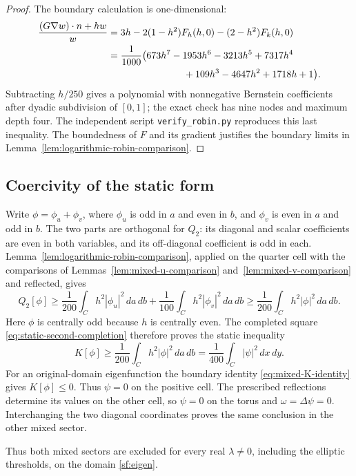 \documentclass[reqno,11pt]{amsart}
\numberwithin{equation}{section}
\theoremstyle{remark}
\begin{document}
\begin{proof}
The boundary calculation is one-dimensional:
\begin{align*}
 \frac{(G\nabla w)\cdot n+hw}{w}
 ={}&3h-2(1-h^2)F_h(h,0)-(2-h^2)F_k(h,0)\\
 ={}&\frac1{1000}\bigl(673h^7-1953h^6-3213h^5+7317h^4\\
    &\hspace{23mm}+109h^3-4647h^2+1718h+1\bigr).
\end{align*}
Subtracting $h/250$ gives a polynomial with nonnegative Bernstein
coefficients after dyadic subdivision of $[0,1]$; the exact check has
nine nodes and maximum depth four.  The independent script
\texttt{verify\_robin.py} reproduces this last
inequality. The boundedness of $F$ and its gradient justifies the
boundary limits in Lemma~\ref{lem:logarithmic-robin-comparison}.
\end{proof}


\subsection{Coercivity of the static form}
Write $\phi=\phi_u+\phi_v$, where $\phi_u$ is odd in $a$ and even
in $b$, and $\phi_v$ is even in $a$ and odd in $b$. The two parts are
orthogonal for $Q_2$: its diagonal and scalar coefficients are even in
both variables, and its off-diagonal coefficient is odd in each.
Lemma~\ref{lem:logarithmic-robin-comparison}, applied on the quarter
cell with the comparisons of Lemmas~\ref{lem:mixed-u-comparison}
and~\ref{lem:mixed-v-comparison} and reflected, gives
\[
 Q_2[\phi]\ge\frac1{200}\int_C h^2|\phi_u|^2\,da\,db
           +\frac1{100}\int_C h^2|\phi_v|^2\,da\,db
 \ge\frac1{200}\int_C h^2|\phi|^2\,da\,db.
\]
Here $\phi$ is centrally odd because $h$ is centrally even.
The completed square \eqref{eq:static-second-completion} therefore
proves the static inequality
\begin{equation}\label{eq:mixed-static-coercivity}
 K[\phi]\ge\frac1{200}\int_C h^2|\phi|^2\,da\,db
           =\frac1{400}\int_C|\psi|^2\,dx\,dy.
\end{equation}
For an original-domain eigenfunction the boundary identity
\eqref{eq:mixed-K-identity} gives $K[\phi]\le0$. Thus $\psi=0$ on the positive cell. The prescribed
reflections determine its values on the other cell, so $\psi=0$ on
the torus and $\omega=\Delta\psi=0$. Interchanging the two diagonal
coordinates proves the same conclusion in the other mixed sector.

Thus both mixed sectors are excluded for every real $\lambda\ne0$,
including the elliptic thresholds, on the domain \eqref{sf:eigen}.
\end{document}
